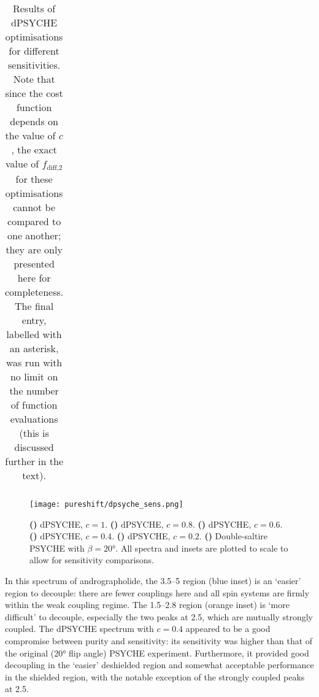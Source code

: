 \begin{table}[htb]
\begin{tabular}{cccc}
        \bottomrule
    \end{tabular}
    \caption[dPSYCHE optimisation results for different sensitivities]{
        Results of dPSYCHE optimisations for different sensitivities.
        Note that since the cost function depends on the value of $c$, the exact value of $f_\text{diff,2}$ for these optimisations cannot be compared to one another; they are only presented here for completeness.
        The final entry, labelled with an asterisk, was run with no limit on the number of function evaluations (this is discussed further in the text).
    }
    \label{tbl:dpsyche_sens}
\end{table}

\begin{figure}[htbp]
    \centering
    \texttt{[image: pureshift/dpsyche\_sens.png]}%
    {\label{fig:dpsyche_sens_d1}}%
    {\label{fig:dpsyche_sens_d0p8}}%
    {\label{fig:dpsyche_sens_d0p6}}%
    {\label{fig:dpsyche_sens_d0p4}}%
    {\label{fig:dpsyche_sens_d0p2}}%
    {\label{fig:dpsyche_sens_p}}%
    \caption[dPSYCHE optimisations with different sensitivities]{
        \textbf{()} dPSYCHE, $c = 1$.
        \textbf{()} dPSYCHE, $c = 0.8$.
        \textbf{()} dPSYCHE, $c = 0.6$.
        \textbf{()} dPSYCHE, $c = 0.4$.
        \textbf{()} dPSYCHE, $c = 0.2$.
        \textbf{()} Double-saltire PSYCHE with $\beta = \ang{20}$.
        All spectra and insets are plotted to scale to allow for sensitivity comparisons.
    }
    \label{fig:dpsyche_sens}
\end{figure}

In this spectrum of andrographolide, the \qtyrange{3.5}{5}{\ppm} region (blue inset) is an `easier' region to decouple: there are fewer couplings here and all spin systems are firmly within the weak coupling regime.
The \qtyrange{1.5}{2.8}{\ppm} region (orange inset) is `more difficult' to decouple, especially the two peaks at \SI{2.5}{\ppm}, which are mutually strongly coupled.
The dPSYCHE spectrum with $c = 0.4$ appeared to be a good compromise between purity and sensitivity: its sensitivity was higher than that of the original (\ang{20} flip angle) PSYCHE experiment.
Furthermore, it provided good decoupling in the `easier' deshielded region and somewhat acceptable performance in the shielded region, with the notable exception of the strongly coupled peaks at \SI{2.5}{\ppm}.

